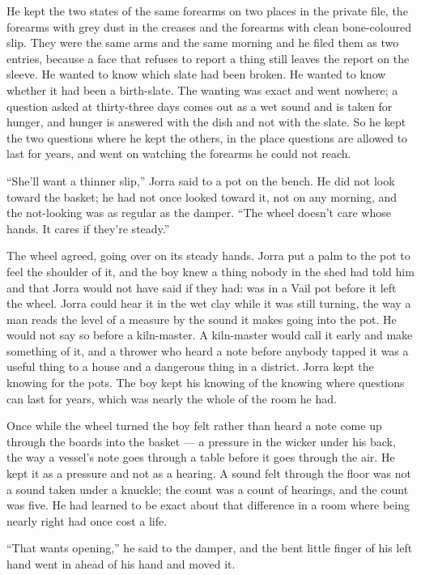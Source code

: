 He kept the two states of the same forearms on two places in the private file, the forearms with grey dust in the creases and the forearms with clean bone-coloured slip. They were the same arms and the same morning and he filed them as two entries, because a face that refuses to report a thing still leaves the report on the sleeve. He wanted to know which slate had been broken. He wanted to know whether it had been a birth-slate. The wanting was exact and went nowhere; a question asked at thirty-three days comes out as a wet sound and is taken for hunger, and hunger is answered with the dish and not with the slate. So he kept the two questions where he kept the others, in the place questions are allowed to last for years, and went on watching the forearms he could not reach.

\scenebreak

“She'll want a thinner slip,” Jorra said to a pot on the bench. He did not look toward the basket; he had not once looked toward it, not on any morning, and the not-looking was as regular as the damper. “The wheel doesn't care whose hands. It cares if they're steady.”

The wheel agreed, going over on its steady hands. Jorra put a palm to the pot to feel the shoulder of it, and the boy knew a thing nobody in the shed had told him and that Jorra would not have said if they had:  was in a Vail pot before it left the wheel. Jorra could hear it in the wet clay while it was still turning, the way a man reads the level of a measure by the sound it makes going into the pot. He would not say so before a kiln-master. A kiln-master would call it early and make something of it, and a thrower who heard a note before anybody tapped it was a useful thing to a house and a dangerous thing in a district. Jorra kept the knowing for the pots. The boy kept his knowing of the knowing where questions can last for years, which was nearly the whole of the room he had.

Once while the wheel turned the boy felt rather than heard a note come up through the boards into the basket --- a pressure in the wicker under his back, the way a vessel's note goes through a table before it goes through the air. He kept it as a pressure and not as a hearing. A sound felt through the floor was not a sound taken under a knuckle; the count was a count of hearings, and the count was five. He had learned to be exact about that difference in a room where being nearly right had once cost a life.

“That wants opening,” he said to the damper, and the bent little finger of his left hand went in ahead of his hand and moved it.

